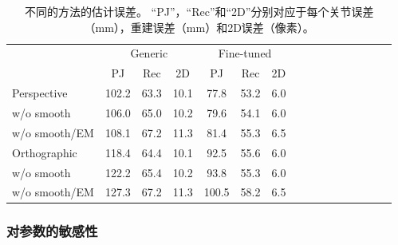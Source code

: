 \begin{table}
\caption{不同的方法的估计误差。 “PJ”，“Rec”和“2D”分别对应于每个关节误差（mm），重建误差（mm）和2D误差（像素）。}
\centering
\renewcommand{\arraystretch}{1.5}
\begin{tabular}{l*{15}{c}}
\toprule
& \multicolumn{3}{c}{Generic} & \multicolumn{3}{c}{Fine-tuned} \\
 & PJ & Rec  & 2D & PJ & Rec & 2D \\
\toprule
Perspective & 102.2 & 63.3 & 10.1 & 77.8 & 53.2 & 6.0 \\
w/o smooth & 106.0 & 65.0 & 10.2 & 79.6 & 54.1 & 6.0 \\
w/o smooth/EM & 108.1 & 67.2 & 11.3 & 81.4 & 55.3 & 6.5 \\
\hline
Orthographic & 118.4 & 64.4 & 10.1 & 92.5 & 55.6 & 6.0 \\
w/o smooth & 122.2 & 65.4 & 10.2 & 93.8 & 55.3 & 6.0 \\
w/o smooth/EM  \cite{zhou2015sparse} & 127.3 & 67.2 & 11.3 & 100.5 & 58.2 & 6.5 \\
\toprule
\end{tabular}
\label{tab:steps}
\end{table}

\subsubsection{对参数的敏感性}

